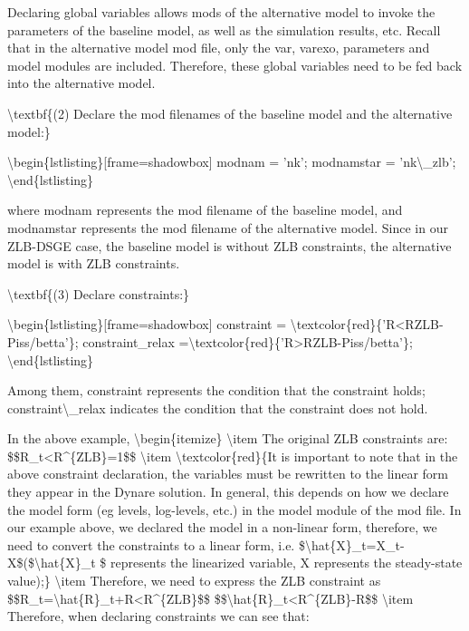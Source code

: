 \documentclass[10pt,math=newtx,citestyle=gb7714-2015,bibstyle=gb7714-2015]{elegantbook}
\begin{document}
	Declaring global variables allows mods of the alternative model to invoke the parameters of the baseline model, as well as the simulation results, etc. Recall that in the alternative model mod file, only the var, varexo, parameters and model modules are included. Therefore, these global variables need to be fed back into the alternative model.
	
	\textbackslash{}textbf\{(2) Declare the mod filenames of the baseline model and the alternative model:\}
	
	\textbackslash{}begin\{lstlisting\}[frame=shadowbox]
	modnam = 'nk';
	modnamstar = 'nk\textbackslash{}\_zlb';
	\textbackslash{}end\{lstlisting\}
	
	where modnam represents the mod filename of the baseline model, and modnamstar represents the mod filename of the alternative model. Since in our ZLB-DSGE case, the baseline model is without ZLB constraints, the alternative model is with ZLB constraints.
	
	\textbackslash{}textbf\{(3) Declare constraints:\}
	
	\textbackslash{}begin\{lstlisting\}[frame=shadowbox]
	constraint = \textbackslash{}textcolor\{red\}\{'R<RZLB-Piss/betta'\};
	constraint\_relax =\textbackslash{}textcolor\{red\}\{'R>RZLB-Piss/betta'\};
	\textbackslash{}end\{lstlisting\}
	
	Among them, constraint represents the condition that the constraint holds; constraint\textbackslash{}\_relax indicates the condition that the constraint does not hold.
	
	In the above example,
	\textbackslash{}begin\{itemize\}
	\textbackslash{}item The original ZLB constraints are:
	\$\$R\_t<R\^{}\{ZLB\}=1\$\$
	\textbackslash{}item \textbackslash{}textcolor\{red\}\{It is important to note that in the above constraint declaration, the variables must be rewritten to the linear form they appear in the Dynare solution. In general, this depends on how we declare the model form (eg levels, log-levels, etc.) in the model module of the mod file. In our example above, we declared the model in a non-linear form, therefore, we need to convert the constraints to a linear form, i.e. \$\textbackslash{}hat\{X\}\_t=X\_t-X\$(\$\textbackslash{}hat\{X\}\_t \$ represents the linearized variable, X represents the steady-state value);\}
	\textbackslash{}item Therefore, we need to express the ZLB constraint as
	\$\$R\_t=\textbackslash{}hat\{R\}\_t+R<R\^{}\{ZLB\}\$\$
	\$\$\textbackslash{}hat\{R\}\_t<R\^{}\{ZLB\}-R\$\$
	\textbackslash{}item Therefore, when declaring constraints we can see that:
	
\end{document}
